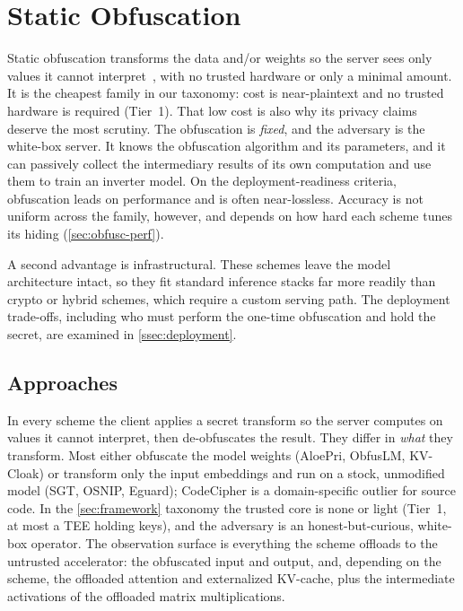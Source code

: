 \section{Static Obfuscation}
\label{sec:obfuscation}

Static obfuscation transforms the data and/or weights so the server sees only values it
cannot interpret~\citep{lin_aloepri,roberts_sgt}, with no trusted hardware or only a minimal amount. It is the cheapest
family in our taxonomy: cost is near-plaintext and no trusted hardware is required (Tier~1).
That low cost is also why its privacy claims deserve the most scrutiny. The obfuscation is
\emph{fixed}, and the adversary is the white-box server. It knows the obfuscation algorithm
and its parameters, and it can passively collect the intermediary results of its own
computation and use them to train an inverter model. On the deployment-readiness criteria,
obfuscation leads on performance and is often near-lossless. Accuracy is not uniform across
the family, however, and depends on how hard each scheme tunes its hiding
(\cref{sec:obfusc-perf}).

A second advantage is infrastructural. These schemes leave the model architecture intact, so
they fit standard inference stacks far more readily than crypto or hybrid schemes, which require
a custom serving path. The deployment
trade-offs, including who must perform the one-time obfuscation and hold the secret, are
examined in \cref{ssec:deployment}.

\subsection{Approaches}
In every scheme the client applies a secret transform so the server computes on values it cannot
interpret, then de-obfuscates the result. They differ in \emph{what} they transform. Most either obfuscate the model weights (AloePri,
ObfusLM, KV-Cloak) or transform only the input embeddings and run on a stock, unmodified
model (SGT, OSNIP, Eguard); CodeCipher is a domain-specific outlier for source code. In the \cref{sec:framework} taxonomy the trusted core
is none or light (Tier~1, at most a TEE holding keys), and the adversary is an
honest-but-curious, white-box operator. The observation surface is everything the scheme
offloads to the untrusted accelerator: the obfuscated input and output, and, depending on the
scheme, the offloaded attention and externalized KV-cache, plus the intermediate activations
of the offloaded matrix multiplications.

